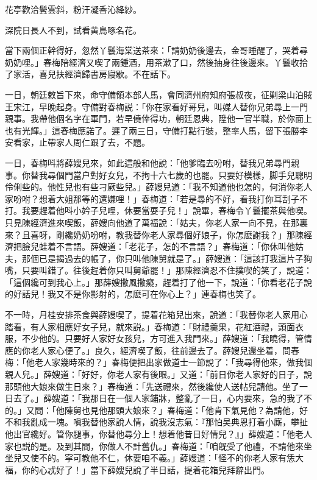 \begin{myquote}
花亭歡洽鬢雲斜，粉汗凝香沁絳紗。

深院日長人不到，試看黄鳥啄名花。
\end{myquote}

當下兩個正幹得好，忽然丫鬟海棠送茶來：「請奶奶後邊去，金哥睡醒了，哭着尋奶奶哩。」春梅陪經濟又喫了兩鍾酒，用茶漱了口，然後抽身往後邊來。丫鬟收拾了家活，喜兒扶經濟歸書房寢歇。不在話下。

一日，朝廷敕旨下來，命守備領本部人馬，會同濟州府知府張叔夜，征剿梁山泊賊王宋江，早晚起身。守備對春梅説：「你在家看好哥兒，叫媒人替你兄弟尋上一門親事。我帶他個名字在軍門，若早僥倖得功，朝廷恩典，陞他一官半職，於你面上也有光輝。」這春梅應諾了。遲了兩三日，守備打點行裝，整率人馬，留下張勝李安看家，止帶家人周仁跟了去，不題。

一日，春梅呌將薛嫂兒來，如此這般和他說：「他爹臨去吩咐，替我兄弟尋門親事。你替我尋個門當户對好女兒，不拘十六七歲的也罷。只要好模樣，脚手兒聰明伶俐些的。他性兒也有些刁厥些兒。」薛嫂兒道：「我不知道他也怎的，何消你老人家吩咐？想着大姐那等的還嫌哩！」春梅道：「若是尋的不好，看我打你耳刮子不打。我要趕着他呌小妗子兒哩，休要當耍子兒！」說畢，春梅令丫鬟擺茶與他喫。只見陳經濟進來喫飯，薛嫂向他道了萬福說：「姑夫，你老人家一向不見，在那裏來？且喜呀，剛纔奶奶吩咐，教我替你老人家尋個好娘子，你怎麽謝我？」那陳經濟把臉兒蛙着不言語。薛嫂道：「老花子，怎的不言語？」春梅道：「你休叫他姑夫，那個已是揭過去的帳了，你只叫他陳舅就是了。」薛嫂道：「這該打我這片子狗嘴，只要叫錯了。往後趕着你只叫舅爺罷！」那陳經濟忍不住撲喫的笑了，說道：「這個纔可到我心上。」那薛嫂撒風撒癡，趕着打了他一下，說道：「你看老花子說的好話兒！我又不是你影射的，怎麽可在你心上？」連春梅也笑了。

不一時，月桂安排茶食與薛嫂喫了，提着花箱兒出來，說道：「我替你老人家用心踏看，有人家相應好女子兒，就來説。」春梅道：「財禮羹果，花紅酒禮，頭面衣服，不少他的。只要好人家好女孩兒，方可進入我門來。」薛嫂道：「我曉得，管情應的你老人家心便了。」良久，經濟喫了飯，往前邊去了。薛嫂兒還坐着，問春梅：「他老人家幾時來的？」春梅便把出家做道士一節說了：「我尋得他來，做我個親人兒。」薛嫂道：「好好，你老人家有後眼。」又道：「前日你老人家好的日子，說那頭他大娘來做生日來？」春梅道：「先送禮來，然後纔使人送帖兒請他。坐了一日去了。」薛嫂道：「我那日在一個人家鋪牀，整亂了一日，心内要來，急的我了不的。」又問：「他陳舅也見他那頭大娘來？」春梅道：「他肯下氣見他？為請他，好不和我亂成一塊。嗔我替他家說人情，說我沒志氣：『那怕吴典恩打着小廝，攀扯他出官纔好。管你腿事，你替他尋分上！想着他昔日好情兒？』」薛嫂道：「他老人家也説的是。及到其間，你做人不計舊仇。」春梅道：「咱旣受了他禮，不請他來坐坐兒又使不的。寜可教他不仁，休要咱不義。」薛嫂道：「怪不的你老人家有恁大福，你的心忒好了！」當下薛嫂兒說了半日話，提着花箱兒拜辭出門。


